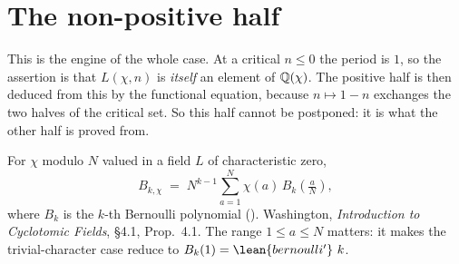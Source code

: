 \section{The non-positive half}
\label{sec:gl1-negative}

This is the engine of the whole case. At a critical $n \leq 0$ the period is $1$, so
the assertion is that $L(\chi,n)$ is \emph{itself} an element of $\mathbb{Q}(\chi)$. The
positive half is then deduced from this by the functional equation, because
$n \mapsto 1-n$ exchanges the two halves of the critical set. So this half cannot be
postponed: it is what the other half is proved from.

\begin{definition}
  \label{def:genBernoulli}
  \leanok
  For $\chi$ modulo $N$ valued in a field $L$ of characteristic zero,
  \[ B_{k,\chi} \;=\; N^{k-1} \sum_{a=1}^{N} \chi(a)\, B_k\!\left(\tfrac{a}{N}\right), \]
  where $B_k$ is the $k$-th Bernoulli polynomial ().
  Washington, \emph{Introduction to Cyclotomic Fields}, \S4.1, Prop.~4.1. The range
  $1 \leq a \leq N$ matters: it makes the trivial-character case reduce to
  $B_k(1) = \lean{bernoulli'}\ k$.
\end{definition}

